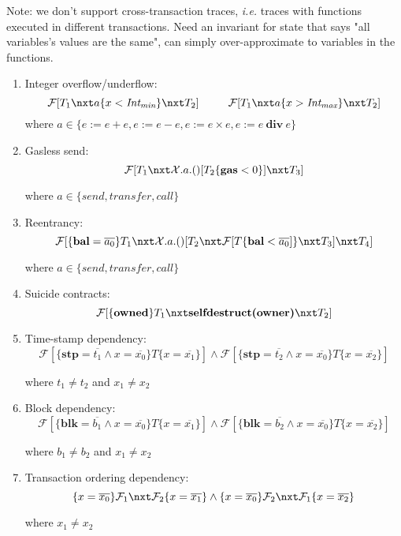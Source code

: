 Note: we don't support cross-transaction traces, \emph{i.e.} traces with functions executed in different transactions. Need an invariant for state that says "all variables's values are the same", can simply over-approximate to variables in the functions.
\begin{enumerate}
	\item Integer overflow/underflow:
	$$
	\mathcal{F}[T_1 \nxt a\{x < \textit{Int}_\textit{min}\} \nxt T_2]~~~~~~~~\mathcal{F}[T_1 \nxt a\{x > \textit{Int}_\textit{max}\} \nxt T_2]
	$$
	where $a \in \{e:= e + e, e:= e - e, e:= e \times e, e:= e~\textbf{div}~e\}$
	\item Gasless send:
	$$
	\mathcal{F}[T_1  \nxt \mathcal{X}.a.()[T_2\{\textbf{gas} < 0\}] \nxt T_3]
	$$
	
	where $a \in \{\textit{send},\textit{transfer},\textit{call}\}$
	\item Reentrancy:
	$$
	\mathcal{F}[\{\textbf{bal} = \overline{a_0}\}T_1 \nxt \mathcal{X}.a.()[T_2 \nxt  \mathcal{F}[T\{\textbf{bal} < \overline{a_0}]\} \nxt T_3] \nxt T_4]
	$$
	
	where $a \in \{\textit{send},\textit{transfer},\textit{call}\}$
	
	\item Suicide contracts:
	$$
	\mathcal{F}[\{\textbf{owned}\}T_1 \nxt \textbf{selfdestruct(owner)} \nxt T_2]
	$$
	
	\item Time-stamp dependency:
	$$
	\mathcal{F}[\{\textbf{stp} = \overline{t_1} \wedge x = \overline{x_0}\} T \{x = \overline{x_1}\}] \wedge \mathcal{F}[\{\textbf{stp} = \overline{t_2} \wedge x = \overline{x_0}\} T \{x = \overline{x_2}\}]
	$$
	
	where $t_1 \neq t_2$ and $x_1 \neq x_2$
	\item Block dependency:
	$$
	\mathcal{F}[\{\textbf{blk} = \overline{b_1} \wedge x = \overline{x_0}\} T \{x = \overline{x_1}\}] \wedge \mathcal{F}[\{\textbf{blk} = \overline{b_2} \wedge x = \overline{x_0}\} T \{x = \overline{x_2}\}]
	$$
	
	where $b_1 \neq b_2$ and $x_1 \neq x_2$
	
	
	\item Transaction ordering dependency:
	$$
	\{x = \overline{x_0}\}\mathcal{F}_1 \nxt \mathcal{F}_2\{x = \overline{x_1}\} \wedge \{x = \overline{x_0}\}\mathcal{F}_2  \nxt \mathcal{F}_1 \{x = \overline{x_2}\}
	$$
	
	where $x_1 \neq x_2$
\end{enumerate}


